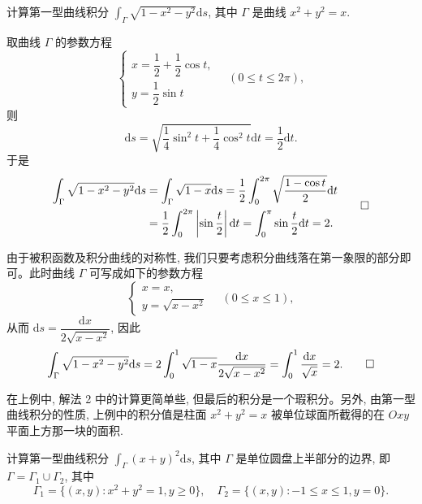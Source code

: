 \begin{example}\label{example:ma-16-1-1}
计算第一型曲线积分 $\int_\Gamma \sqrt{1-x^2-y^2}\mathrm ds$, 其中 $\Gamma$ 是曲线 $x^2+y^2=x$.
\end{example}


\begin{solve}[{解法 1}]
取曲线 $\Gamma$ 的参数方程
\[
  \begin{cases}
    x=\dfrac12+\dfrac12\cos t,\\
    y=\dfrac12\sin t
  \end{cases}
  \quad(0\leqslant t\leqslant 2\pi),
\]
则
\[
  \mathrm ds=\sqrt{\frac14\sin^2t+\frac14\cos^2t}\mathrm dt
  =\frac12\mathrm dt.
\]
于是
\[
\begin{aligned}
  \int_\Gamma \sqrt{1-x^2-y^2}\mathrm ds
  &=\int_\Gamma \sqrt{1-x}\mathrm ds
    =\frac12\int_0^{2\pi}\sqrt{\frac{1-\cos t}{2}}\mathrm dt\\
  &=\frac12\int_0^{2\pi}\left|\sin\frac t2\right|\mathrm dt
    =\int_0^\pi\sin\frac t2\mathrm dt=2.
\end{aligned}
\qedhere
\]
\end{solve}


\begin{solve}[{解法 2}]
由于被积函数及积分曲线的对称性, 我们只要考虑积分曲线落在第一象限的部分即可。此时曲线 $\Gamma$ 可写成如下的参数方程
\[
  \begin{cases}
    x=x,\\
    y=\sqrt{x-x^2}
  \end{cases}
  \quad(0\leqslant x\leqslant1),
\]
从而 $\mathrm ds=\dfrac{\mathrm dx}{2\sqrt{x-x^2}}$, 因此
\[
  \int_\Gamma \sqrt{1-x^2-y^2}\mathrm ds
  =2\int_0^1\sqrt{1-x}\frac{\mathrm dx}{2\sqrt{x-x^2}}
  =\int_0^1\frac{\mathrm dx}{\sqrt x}=2.
\qedhere
\]
\end{solve}


\begin{remark}\label{remark:ma-16-source-9}
在上例中, 解法 2 中的计算更简单些, 但最后的积分是一个瑕积分。另外, 由第一型曲线积分的性质, 上例中的积分值是柱面 $x^2+y^2=x$ 被单位球面所截得的在 $Oxy$ 平面上方那一块的面积.
\end{remark}


\begin{example}\label{example:ma-16-1-2}
计算第一型曲线积分 $\int_\Gamma (x+y)^2\mathrm ds$, 其中 $\Gamma$ 是单位圆盘上半部分的边界, 即 $\Gamma=\Gamma_1\cup\Gamma_2$, 其中
\[
  \Gamma_1=\{(x,y):x^2+y^2=1,y\geqslant0\},\quad
  \Gamma_2=\{(x,y):-1\leqslant x\leqslant1,y=0\}.
\]
\end{example}


